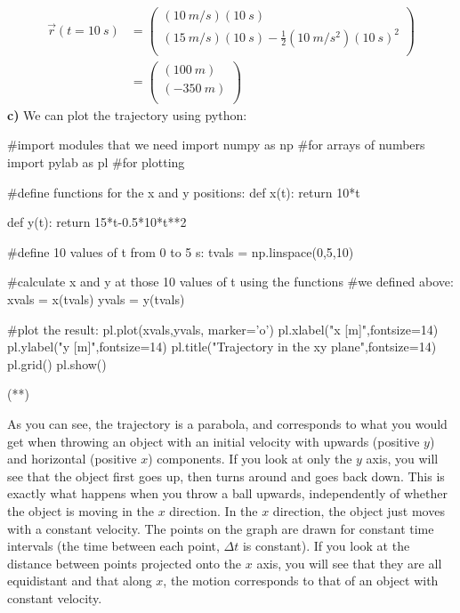 \begin{example}
\begin{align*}
\vec r(t=\SI{10}{s})&= \begin{pmatrix}
           (\SI{10}{m/s})(\SI{10}{s}) \\
           (\SI{15}{m/s})(\SI{10}{s})-\frac{1}{2}(\SI{10}{m/s^2})(\SI{10}{s})^2 \\
         \end{pmatrix}\\
         &= \begin{pmatrix}
           (\SI{100}{m}) \\
           (\SI{-350}{m})\\
         \end{pmatrix}
\end{align*}
\textbf{c)} We can plot the trajectory using python:

\begin{python}[caption=Trajectory in xy plane]
#import modules that we need
import numpy as np #for arrays of numbers
import pylab as pl #for plotting

#define functions for the x and y positions:
def x(t):
    return 10*t

def y(t):
    return 15*t-0.5*10*t**2

#define 10 values of t from 0 to 5 s:
tvals = np.linspace(0,5,10)

#calculate x and y at those 10 values of t using the functions
#we defined above:
xvals = x(tvals)
yvals = y(tvals)

#plot the result:
pl.plot(xvals,yvals, marker='o')
pl.xlabel("x [m]",fontsize=14)
pl.ylabel("y [m]",fontsize=14)
pl.title("Trajectory in the xy plane",fontsize=14)
pl.grid()
pl.show()
\end{python}
\begin{poutput}
(**)
\end{poutput}
As you can see, the trajectory is a parabola, and corresponds to what you would get when throwing an object with an initial velocity with upwards (positive $y$) and horizontal (positive $x$) components. If you look at only the $y$ axis, you will see that the object first goes up, then turns around and goes back down. This is exactly what happens when you throw a ball upwards, independently of whether the object is moving in the $x$ direction. In the $x$ direction, the object just moves with a constant velocity. The points on the graph are drawn for constant time intervals (the time between each point, $\Delta t$ is constant). If you look at the distance between points projected onto the $x$ axis, you will see that they are all equidistant and that along $x$, the motion corresponds to that of an object with constant velocity. 
\end{example}
